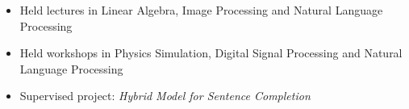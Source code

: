 \documentclass[10pt,a4paper]{source/altacv}
\begin{document}
\divider



\begin{itemize}
    \item   \small{Held lectures in Linear Algebra, Image Processing and Natural Language Processing}
    \item   \small{Held workshops in Physics Simulation, Digital Signal Processing and Natural Language Processing}
    \item   \small{Supervised project: \textit{Hybrid Model for Sentence Completion}}
\end{itemize}

\medskip







\end{document}
